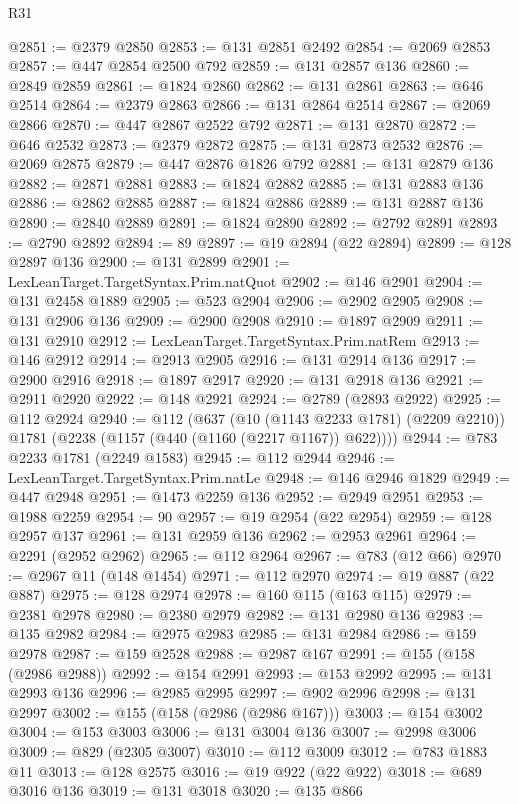 \begin{lexlean}{R31}
\begin{coremodule}
@2851 := @2379 @2850
@2853 := @131 @2851 @2492
@2854 := @2069 @2853
@2857 := @447 @2854 @2500 @792
@2859 := @131 @2857 @136
@2860 := @2849 @2859
@2861 := @1824 @2860
@2862 := @131 @2861
@2863 := @646 @2514
@2864 := @2379 @2863
@2866 := @131 @2864 @2514
@2867 := @2069 @2866
@2870 := @447 @2867 @2522 @792
@2871 := @131 @2870
@2872 := @646 @2532
@2873 := @2379 @2872
@2875 := @131 @2873 @2532
@2876 := @2069 @2875
@2879 := @447 @2876 @1826 @792
@2881 := @131 @2879 @136
@2882 := @2871 @2881
@2883 := @1824 @2882
@2885 := @131 @2883 @136
@2886 := @2862 @2885
@2887 := @1824 @2886
@2889 := @131 @2887 @136
@2890 := @2840 @2889
@2891 := @1824 @2890
@2892 := @2792 @2891
@2893 := @2790 @2892
@2894 := 89
@2897 := @19 @2894 (@22 @2894)
@2899 := @128 @2897 @136
@2900 := @131 @2899
@2901 := LexLeanTarget.TargetSyntax.Prim.natQuot
@2902 := @146 @2901
@2904 := @131 @2458 @1889
@2905 := @523 @2904
@2906 := @2902 @2905
@2908 := @131 @2906 @136
@2909 := @2900 @2908
@2910 := @1897 @2909
@2911 := @131 @2910
@2912 := LexLeanTarget.TargetSyntax.Prim.natRem
@2913 := @146 @2912
@2914 := @2913 @2905
@2916 := @131 @2914 @136
@2917 := @2900 @2916
@2918 := @1897 @2917
@2920 := @131 @2918 @136
@2921 := @2911 @2920
@2922 := @148 @2921
@2924 := @2789 (@2893 @2922)
@2925 := @112 @2924
@2940 := @112
    (@637
      (@10 (@1143 @2233 @1781) (@2209 @2210))
      @1781
      (@2238 (@1157 (@440 (@1160 (@2217 @1167)) @622))))
@2944 := @783 @2233 @1781 (@2249 @1583)
@2945 := @112 @2944
@2946 := LexLeanTarget.TargetSyntax.Prim.natLe
@2948 := @146 @2946 @1829
@2949 := @447 @2948
@2951 := @1473 @2259 @136
@2952 := @2949 @2951
@2953 := @1988 @2259
@2954 := 90
@2957 := @19 @2954 (@22 @2954)
@2959 := @128 @2957 @137
@2961 := @131 @2959 @136
@2962 := @2953 @2961
@2964 := @2291 (@2952 @2962)
@2965 := @112 @2964
@2967 := @783 (@12 @66)
@2970 := @2967 @11 (@148 @1454)
@2971 := @112 @2970
@2974 := @19 @887 (@22 @887)
@2975 := @128 @2974
@2978 := @160 @115 (@163 @115)
@2979 := @2381 @2978
@2980 := @2380 @2979
@2982 := @131 @2980 @136
@2983 := @135 @2982
@2984 := @2975 @2983
@2985 := @131 @2984
@2986 := @159 @2978
@2987 := @159 @2528
@2988 := @2987 @167
@2991 := @155 (@158 (@2986 @2988))
@2992 := @154 @2991
@2993 := @153 @2992
@2995 := @131 @2993 @136
@2996 := @2985 @2995
@2997 := @902 @2996
@2998 := @131 @2997
@3002 := @155 (@158 (@2986 (@2986 @167)))
@3003 := @154 @3002
@3004 := @153 @3003
@3006 := @131 @3004 @136
@3007 := @2998 @3006
@3009 := @829 (@2305 @3007)
@3010 := @112 @3009
@3012 := @783 @1883 @11
@3013 := @128 @2575
@3016 := @19 @922 (@22 @922)
@3018 := @689 @3016 @136
@3019 := @131 @3018
@3020 := @135 @866

\end{coremodule}
\end{lexlean}
